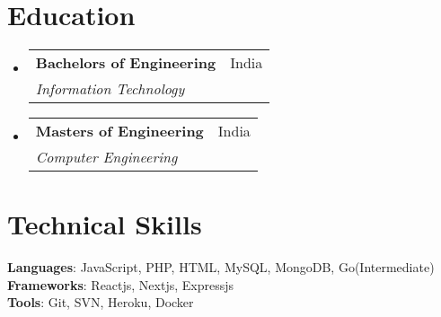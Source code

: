 \documentclass[letterpaper,11pt]{article}
\makeatletter
\newcommand{\resumeSubheading}[4]{
  \vspace{-2pt}\item
    \begin{tabular*}{0.97\textwidth}[t]{l@{\extracolsep{\fill}}r}
      \textbf{#1} & #2 \\
      \textit{\small#3} & \textit{\small #4} \\
    \end{tabular*}\vspace{-7pt}
}
\newcommand{\resumeSubHeadingListStart}{\begin{itemize}[leftmargin=0.15in, label={}]}
\newcommand{\resumeSubHeadingListEnd}{\end{itemize}}
\makeatother
\begin{document}
\section{Education}
  \resumeSubHeadingListStart
    \resumeSubheading
      {Bachelors of Engineering}{India}
      {Information Technology}{}
    \resumeSubheading
      {Masters of Engineering}{India}
      {Computer Engineering}{}
  \resumeSubHeadingListEnd


%
\section{Technical Skills}
 \begin{itemize}[leftmargin=0.15in, label={}]
    \small{\item{
     \textbf{Languages}{: JavaScript, PHP, HTML, MySQL, MongoDB, Go(Intermediate) } \\
     \textbf{Frameworks}{: Reactjs, Nextjs, Expressjs } \\
     \textbf{Tools}{: Git, SVN, Heroku, Docker} \\
    }}
 \end{itemize}


\end{document}
